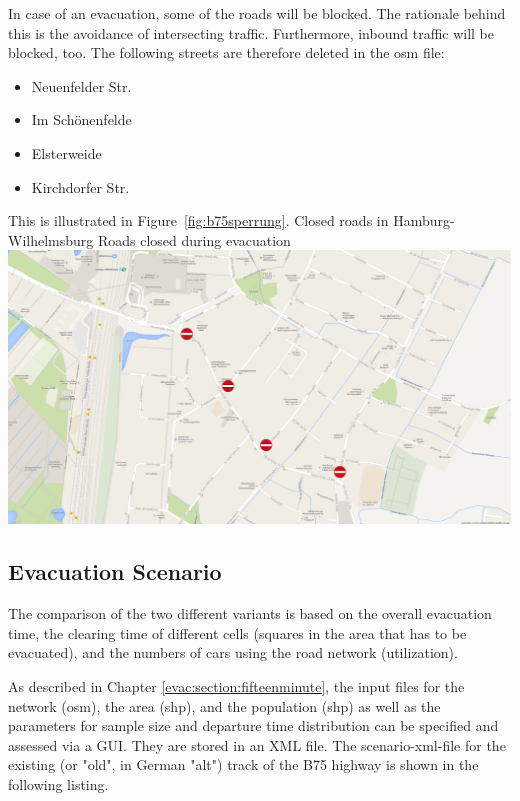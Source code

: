 In case of an evacuation, some of the roads will be blocked. The rationale behind this is the avoidance of intersecting traffic. Furthermore, inbound traffic will be blocked, too.
The following streets are therefore deleted in the osm file:
%
\begin{itemize}
	\item Neuenfelder Str. 
	\item Im Schönenfelde
	\item Elsterweide
	\item Kirchdorfer Str.
\end{itemize}
%
This is illustrated in Figure~\ref{fig:b75sperrung}.
%
%
\createfigure%
{Closed roads in Hamburg-Wilhelmsburg}%
{Roads closed during evacuation}%
{\label{fig:b75sperrung}}%
{\includegraphics[width=0.7\linewidth]{using/figures/B75sperrung}}%
{}

\subsection{Evacuation Scenario}
The comparison of the two different variants is based on the overall evacuation time, the clearing time of different cells (squares in the area that has to be evacuated), and the numbers of cars using the road network (utilization).

As described in Chapter \ref{evac:section:fifteenminute}, the input files for the network (osm), the area (shp), and the population (shp) as well as the parameters for sample size and departure time distribution can be specified and assessed via a GUI. They are stored in an XML file. The scenario-xml-file for the existing (or "old", in German "alt") track of the B75 highway is shown in the following listing. 



